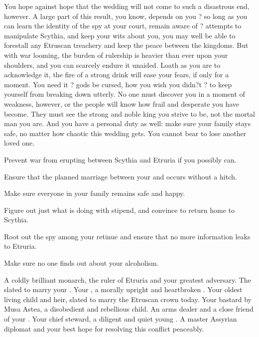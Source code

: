 \documentclass[char]{Kos}
\begin{document}
    You hope against hope that the wedding will not come to such a disastrous end, however. A large part of this result, you know, depends on you ? so long as you can learn the identity of the spy at your court, remain aware of \cEtruriaKing{}? attempts to manipulate Scythia, and keep your wits about you, you may well be able to forestall any Etruscan treachery and keep the peace between the kingdoms. But with war looming, the burden of rulership is heavier than ever upon your shoulders, and you can scarcely endure it unaided. Loath as you are to acknowledge it, the fire of a strong drink will ease your fears, if only for a moment. You need it ? gods be cursed, how you wish you didn?t ? to keep yourself from breaking down utterly. No one must discover you in a moment of weakness, however, or the people will know how frail and desperate you have become. They must see the strong and noble king you strive to be, not the mortal man you are. And you have a personal duty as well: make sure your family stays safe, no matter how chaotic this wedding gets. You cannot bear to lose another loved one.

\begin{itemz}[Goals]
\item Prevent war from erupting between Scythia and Etruria if you possibly can.
\item Ensure that the planned marriage between your \cBride{\offspring} and \cGroom{} occurs without a hitch.
\item Make sure everyone in your family remains safe and happy.
\item Figure out just what \cWard{} is doing with \cWard{\their} stipend, and convince \cWard{\them} to return home to Scythia.
\item Root out the spy among your retinue and ensure that no more information leaks to Etruria.
\item Make sure no one finds out about your alcoholism.
\end{itemz}

\begin{contacts}
\contact{\cEtruriaKing{}} A coldly brilliant monarch, the ruler of Etruria and your greatest adversary.
\contact{\cGroom{}} The \cGroom{\human} slated to marry your \cBride{\offspring}.
\contact{\cScythiaQueen{}} Your \cScythiaQueen{\spouse}, a morally upright and heartbroken \cScythiaQueen{\human}.
\contact{\cBride{}} Your oldest living child and heir, slated to marry the Etruscan crown  today.
\contact{\cWard{}} Your bastard \cWard{\offspring} by Musa Astea, a disobedient and rebellious child.
\contact{\cArmsDealer{}} An arms dealer and a close friend of your \cScythiaQueen{\spouse}.
\contact{\cButler{}} Your chief steward, a diligent and quiet young \cButler{\human}.
 A master Assyrian diplomat and your best hope for resolving this conflict peaceably.
\end{contacts}
\end{document}
